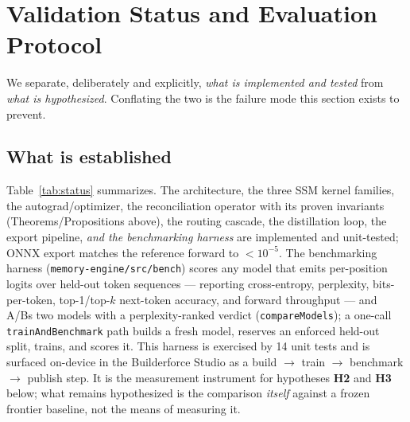 \documentclass[journal,onecolumn,11pt]{IEEEtran}
\begin{document}
\section{Validation Status and Evaluation Protocol}
\label{sec:eval}
We separate, deliberately and explicitly, \emph{what is implemented and tested}
from \emph{what is hypothesized}. Conflating the two is the failure mode this
section exists to prevent.

\subsection{What is established}
Table~\ref{tab:status} summarizes. The architecture, the three SSM kernel
families, the autograd/optimizer, the reconciliation operator with its proven
invariants (Theorems/Propositions above), the routing cascade, the distillation
loop, the export pipeline, \emph{and the benchmarking harness} are implemented
and unit-tested; ONNX export matches the reference forward to $<\!10^{-5}$. The
benchmarking harness (\texttt{memory-engine/src/bench}) scores any model that
emits per-position logits over held-out token sequences --- reporting
cross-entropy, perplexity, bits-per-token, top-1/top-$k$ next-token accuracy,
and forward throughput --- and A/Bs two models with a perplexity-ranked verdict
(\texttt{compareModels}); a one-call \texttt{trainAndBenchmark} path builds a
fresh model, reserves an enforced held-out split, trains, and scores it. This
harness is exercised by 14 unit tests and is surfaced on-device in the
Builderforce Studio as a build $\to$ train $\to$ benchmark $\to$ publish step.
It is the measurement instrument for hypotheses \textbf{H2} and \textbf{H3}
below; what remains hypothesized is the comparison \emph{itself} against a
frozen frontier baseline, not the means of measuring it.
\end{document}
